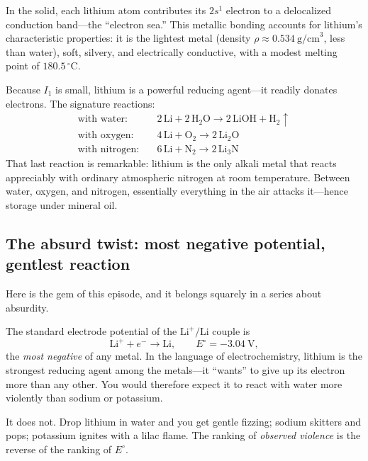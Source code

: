 \documentclass[11pt, letterpaper]{article}
\newcommand{\Li}{\text{Li}}
\newcommand{\Lip}{\text{Li}^{+}}
\begin{document}
In the solid, each lithium atom contributes its $2s^1$ electron to a delocalized conduction band---the ``electron sea.'' This metallic bonding accounts for lithium's characteristic properties: it is the lightest metal (density $\rho \approx 0.534\ \text{g/cm}^3$, less than water), soft, silvery, and electrically conductive, with a modest melting point of $180.5\,^\circ\text{C}$.

Because $I_1$ is small, lithium is a powerful reducing agent---it readily donates electrons. The signature reactions:
\begin{align}
  \text{with water:} \quad & 2\,\Li + 2\,\text{H}_2\text{O} \rightarrow 2\,\text{LiOH} + \text{H}_2\uparrow \\[2pt]
  \text{with oxygen:} \quad & 4\,\Li + \text{O}_2 \rightarrow 2\,\text{Li}_2\text{O} \\[2pt]
  \text{with nitrogen:} \quad & 6\,\Li + \text{N}_2 \rightarrow 2\,\text{Li}_3\text{N}
\end{align}
That last reaction is remarkable: lithium is the only alkali metal that reacts appreciably with ordinary atmospheric nitrogen at room temperature. Between water, oxygen, and nitrogen, essentially everything in the air attacks it---hence storage under mineral oil.

\subsection{The absurd twist: most negative potential, gentlest reaction}

Here is the gem of this episode, and it belongs squarely in a series about absurdity.

The standard electrode potential of the $\Lip/\Li$ couple is
\begin{equation}
  \Lip + e^- \rightarrow \Li, \qquad E^\circ = -3.04\ \text{V},
\end{equation}
the \textit{most negative} of any metal. In the language of electrochemistry, lithium is the strongest reducing agent among the metals---it ``wants'' to give up its electron more than any other. You would therefore expect it to react with water more violently than sodium or potassium.

It does not. Drop lithium in water and you get gentle fizzing; sodium skitters and pops; potassium ignites with a lilac flame. The ranking of \textit{observed violence} is the reverse of the ranking of $E^\circ$.
\end{document}
